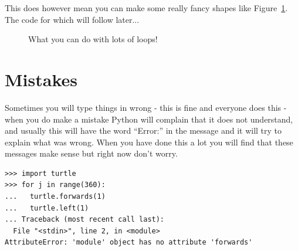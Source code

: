 \documentclass[a4paper, 11pt]{book}
\begin{document}
This does however mean you can make some really fancy shapes like
Figure~\ref{figure-fancy}. The code for which will follow later...

\begin{figure}
\label{figure-fancy}
\centering
{}
\caption{What you can do with lots of loops!}
\end{figure}

\section{Mistakes}

Sometimes you will type things in wrong - this is fine and everyone does this - when you do make a mistake Python will complain that it does not understand, and usually this will have the word ``Error:'' in the message and it will try to explain what was wrong. When you have done this a lot you will find that these messages make sense but right now don't worry.

{\small
\begin{verbatim}
>>> import turtle
>>> for j in range(360):
...   turtle.forwards(1)
...   turtle.left(1)
... Traceback (most recent call last):
  File "<stdin>", line 2, in <module>
AttributeError: 'module' object has no attribute 'forwards'
\end{verbatim}
}
\end{document}
